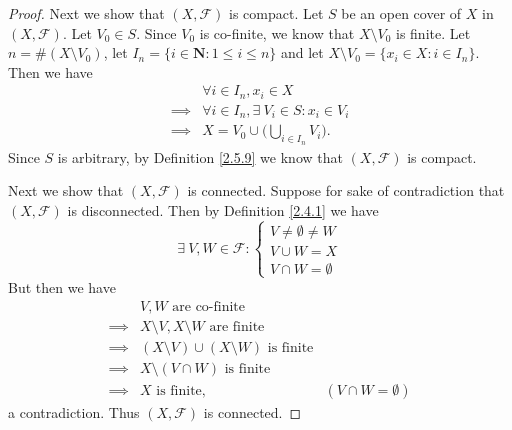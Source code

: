 \begin{proof}
    Next we show that \((X, \mathcal{F})\) is compact.
    Let \(S\) be an open cover of \(X\) in \((X, \mathcal{F})\).
    Let \(V_0 \in S\).
    Since \(V_0\) is co-finite, we know that \(X \setminus V_0\) is finite.
    Let \(n = \#(X \setminus V_0)\), let \(I_n = \{i \in \mathbf{N} : 1 \leq i \leq n\}\) and let \(X \setminus V_0 = \{x_i \in X : i \in I_n\}\).
    Then we have
    \begin{align*}
                 & \forall i \in I_n, x_i \in X                        \\
        \implies & \forall i \in I_n, \exists\ V_i \in S : x_i \in V_i \\
        \implies & X = V_0 \cup \bigg(\bigcup_{i \in I_n} V_i\bigg).
    \end{align*}
    Since \(S\) is arbitrary, by Definition \ref{2.5.9} we know that \((X, \mathcal{F})\) is compact.

    Next we show that \((X, \mathcal{F})\) is connected.
    Suppose for sake of contradiction that \((X, \mathcal{F})\) is disconnected.
    Then by Definition \ref{2.4.1} we have
    \[
        \exists\ V, W \in \mathcal{F} : \begin{cases}
            V \neq \emptyset \neq W \\
            V \cup W = X            \\
            V \cap W = \emptyset
        \end{cases}
    \]
    But then we have
    \begin{align*}
                 & V, W \text{ are co-finite}                                                      \\
        \implies & X \setminus V, X \setminus W \text{ are finite}                                 \\
        \implies & (X \setminus V) \cup (X \setminus W) \text{ is finite}                          \\
        \implies & X \setminus (V \cap W) \text{ is finite}                                        \\
        \implies & X \text{ is finite},                                   & (V \cap W = \emptyset)
    \end{align*}
    a contradiction.
    Thus \((X, \mathcal{F})\) is connected.


\end{proof}

